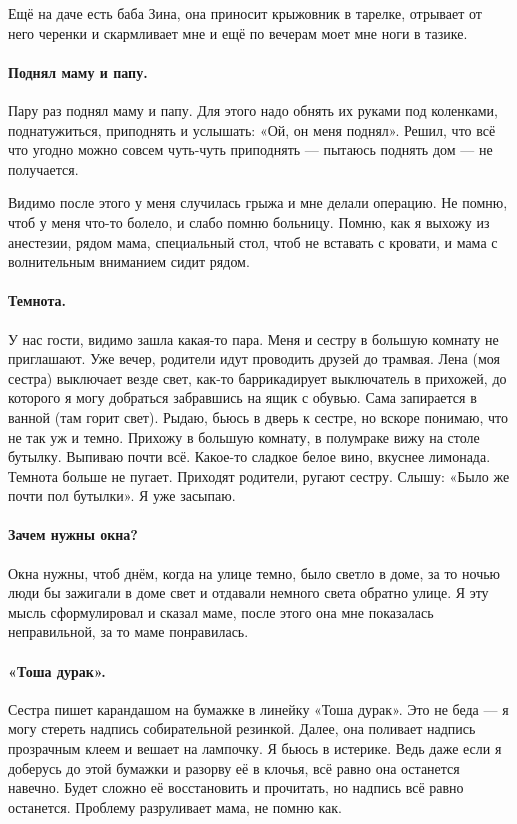 \documentclass{book}
\begin{document}
Ещё на даче есть баба Зина, она приносит крыжовник в тарелке, отрывает от него черенки и скармливает мне и
ещё по вечерам моет мне ноги в тазике.

\paragraph{Поднял маму и папу.}
Пару раз поднял маму и папу.
Для этого надо обнять их руками под коленками, поднатужиться, приподнять и услышать: «Ой, он меня поднял».
Решил, что всё что угодно можно совсем чуть-чуть приподнять --- пытаюсь поднять дом --- не получается.

Видимо после этого у меня случилась грыжа и мне делали операцию.
Не помню, чтоб у меня что-то болело, и слабо помню больницу.
Помню, как я выхожу из анестезии, рядом мама, специальный стол, чтоб не вставать с кровати, и мама с волнительным вниманием сидит рядом.

\paragraph{Темнота.}
У нас гости, видимо зашла какая-то пара.
Меня и сестру в большую комнату не приглашают.
Уже вечер, родители идут проводить друзей до трамвая.
Лена (моя сестра) выключает везде свет, 
как-то баррикадирует выключатель в прихожей, до которого я могу добраться забравшись на ящик с обувью.
Сама запирается в ванной (там горит свет).
Рыдаю, бьюсь в дверь к сестре, но вскоре понимаю, что не так уж и темно.
Прихожу в большую комнату, в полумраке вижу на столе бутылку.
Выпиваю почти всё.
Какое-то сладкое белое вино, вкуснее лимонада.
Темнота больше не пугает.
Приходят родители, ругают сестру. 
Слышу: «Было же почти пол бутылки».
Я уже засыпаю.

\paragraph{Зачем нужны окна?}
Окна нужны, чтоб днём, когда на улице темно, было светло в доме,
за то ночью люди бы зажигали в доме свет и отдавали немного света обратно улице.
Я эту мысль сформулировал и сказал маме,
после этого она мне показалась неправильной, за то маме понравилась.

\paragraph{«Тоша дурак».}
Сестра пишет карандашом на бумажке в линейку «Тоша дурак».
Это не беда --- я могу стереть надпись собирательной резинкой.
Далее, она поливает надпись прозрачным клеем и вешает на лампочку.
Я бьюсь в истерике. 
Ведь даже если я доберусь до этой бумажки и разорву её в клочья, всё равно она останется навечно.
Будет сложно её восстановить и прочитать, но надпись всё равно останется.
Проблему разруливает мама, не помню как.
\end{document}
